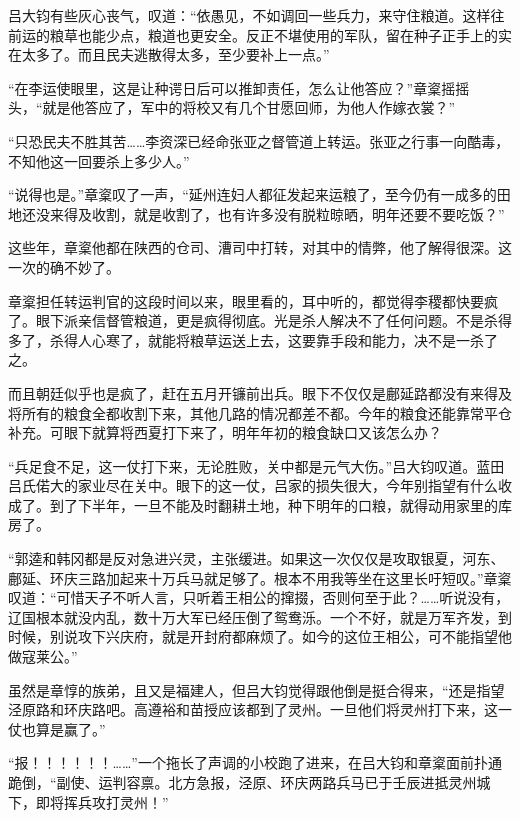 吕大钧有些灰心丧气，叹道：“依愚见，不如调回一些兵力，来守住粮道。这样往前运的粮草也能少点，粮道也更安全。反正不堪使用的军队，留在种子正手上的实在太多了。而且民夫逃散得太多，至少要补上一点。”

“在李运使眼里，这是让种谔日后可以推卸责任，怎么让他答应？”章楶摇摇头，“就是他答应了，军中的将校又有几个甘愿回师，为他人作嫁衣裳？”

“只恐民夫不胜其苦……李资深已经命张亚之督管道上转运。张亚之行事一向酷毒，不知他这一回要杀上多少人。”

“说得也是。”章楶叹了一声，“延州连妇人都征发起来运粮了，至今仍有一成多的田地还没来得及收割，就是收割了，也有许多没有脱粒晾晒，明年还要不要吃饭？”

这些年，章楶他都在陕西的仓司、漕司中打转，对其中的情弊，他了解得很深。这一次的确不妙了。

章楶担任转运判官的这段时间以来，眼里看的，耳中听的，都觉得李稷都快要疯了。眼下派亲信督管粮道，更是疯得彻底。光是杀人解决不了任何问题。不是杀得多了，杀得人心寒了，就能将粮草运送上去，这要靠手段和能力，决不是一杀了之。

而且朝廷似乎也是疯了，赶在五月开镰前出兵。眼下不仅仅是鄜延路都没有来得及将所有的粮食全都收割下来，其他几路的情况都差不都。今年的粮食还能靠常平仓补充。可眼下就算将西夏打下来了，明年年初的粮食缺口又该怎么办？

“兵足食不足，这一仗打下来，无论胜败，关中都是元气大伤。”吕大钧叹道。蓝田吕氏偌大的家业尽在关中。眼下的这一仗，吕家的损失很大，今年别指望有什么收成了。到了下半年，一旦不能及时翻耕土地，种下明年的口粮，就得动用家里的库房了。

“郭逵和韩冈都是反对急进兴灵，主张缓进。如果这一次仅仅是攻取银夏，河东、鄜延、环庆三路加起来十万兵马就足够了。根本不用我等坐在这里长吁短叹。”章楶叹道：“可惜天子不听人言，只听着王相公的撺掇，否则何至于此？……听说没有，辽国根本就没内乱，数十万大军已经压倒了鸳鸯泺。一个不好，就是万军齐发，到时候，别说攻下兴庆府，就是开封府都麻烦了。如今的这位王相公，可不能指望他做寇莱公。”

虽然是章惇的族弟，且又是福建人，但吕大钧觉得跟他倒是挺合得来，“还是指望泾原路和环庆路吧。高遵裕和苗授应该都到了灵州。一旦他们将灵州打下来，这一仗也算是赢了。”

“报！！！！！！……”一个拖长了声调的小校跑了进来，在吕大钧和章楶面前扑通跪倒，“副使、运判容禀。北方急报，泾原、环庆两路兵马已于壬辰进抵灵州城下，即将挥兵攻打灵州！”

